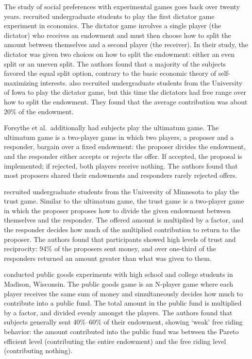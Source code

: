 \documentclass[12pt]{article}
\begin{document}
The study of social preferences with experimental games goes back over twenty years. \cite{kahneman_1986} recruited undergraduate students to play the first dictator game experiment in economics. The dictator game involves a single player (the dictator) who receives an endowment and must then choose how to split the amount between themselves and a second player (the receiver). In their study, the dictator was given two choices on how to split the endowment: either an even split or an uneven split. The authors found that a majority of the subjects favored the equal split option, contrary to the basic economic theory of self-maximizing interests. \cite{forsythe_1994} also recruited undergraduate students from the University of Iowa to play the dictator game, but this time the dictators had free range over how to split the endowment. They found that the average contribution was about 20\% of the endowment.

Forsythe et al.\ additionally had subjects play the ultimatum game. The ultimatum game is a two-player game in which two players, a proposer and a responder, bargain over a fixed endowment: the proposer divides the endowment, and the responder either accepts or rejects the offer. If accepted, the proposal is implemented; if rejected, both players receive nothing. The authors found that
most proposers shared their endowments and responders rarely rejected offers.

\cite{berg_1995} recruited undergraduate students from the University of Minnesota to play the trust game. Similar to the ultimatum game, the trust game is a two-player game in which the proposer proposes how to divide the given endowment between themselves and the responder. The offered amount is multiplied by a factor, and the responder decides how much of the multiplied contribution to return to the proposer. The authors found that participants showed high levels of trust and reciprocity: 94\% of the proposers sent money, and over one-third of the responders returned an amount greater than what was given to them.

\cite{marwell_1981} conducted public goods experiments with high school and college students in Madison, Wisconsin. The public goods game is an N-player game where each player receives the same sum of money and simultaneously decides how much to contribute into a public fund. The total amount in the public fund is multiplied by a factor, and divided evenly amongst the players. The authors found that subjects generally sent 40\%--60\% of their endowment, showing `weak' free riding behavior: the amount contributed into the public fund was between the Pareto efficient level (contributing the entire endowment) and the free riding level (contributing nothing).
\end{document}
